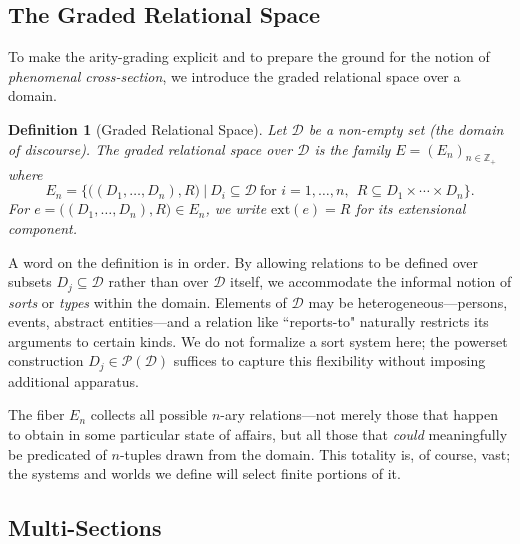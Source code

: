 \documentclass[12pt,a4paper]{article}
\newtheorem{definition}{Definition}[section]
\newcommand{\domain}{\mathcal{D}}
\newcommand{\powerset}{\mathcal{P}}
\begin{document}
\subsection{The Graded Relational Space}

To make the arity-grading explicit and to prepare the ground for the notion of \emph{phenomenal cross-section}, we introduce the graded relational space over a domain.

\begin{definition}[Graded Relational Space]
\label{def:graded-rel-space}
Let $\domain$ be a non-empty set (the \emph{domain of discourse}). The \emph{graded relational space} over $\domain$ is the family $E = (E_n)_{n \in \mathbb{Z}_+}$ where
$$
E_n
=
\Big\{\big((D_1,\dots,D_n),R\big)\ \Big|\ D_i \subseteq \domain\ \text{for } i=1,\dots,n,\ \ R \subseteq D_1 \times \cdots \times D_n\Big\}.
$$
For $e=\big((D_1,\dots,D_n),R\big)\in E_n$, we write $\mathrm{ext}(e)=R$ for its extensional component.
\end{definition}

A word on the definition is in order. By allowing relations to be defined over subsets $D_j \subseteq \domain$ rather than over $\domain$ itself, we accommodate the informal notion of \emph{sorts} or \emph{types} within the domain. Elements of $\domain$ may be heterogeneous---persons, events, abstract entities---and a relation like ``reports-to" naturally restricts its arguments to certain kinds. We do not formalize a sort system here; the powerset construction $D_j \in \powerset(\domain)$ suffices to capture this flexibility without imposing additional apparatus.

The fiber $E_n$ collects all possible $n$-ary relations---not merely those that happen to obtain in some particular state of affairs, but all those that \emph{could} meaningfully be predicated of $n$-tuples drawn from the domain. This totality is, of course, vast; the systems and worlds we define will select finite portions of it.

\subsection{Multi-Sections}
\end{document}
